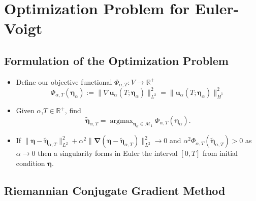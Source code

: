 \documentclass{beamer}
\def\Bmp#1{ \begin{minipage}{#1} }
\def\Emp{ \end{minipage} }
\def\hdo{\dot{H}^1}
\def\pat{\Phi_{\alpha,T}}
\def\M{{\mathcal{M}}}
\def\RR{{\mathbb{R}}}
\def\be{{\boldsymbol \eta}}
\def\bea{{\boldsymbol \eta_\alpha}}
\def\ua{\boldsymbol u_\alpha}
\def\bnabla{\boldsymbol{\nabla}}
\DeclareMathOperator*{\argmax}{argmax}
\begin{document}
\section{Optimization Problem for Euler-Voigt}


\subsection{Formulation of the Optimization Problem}
\frame
{
\hspace*{-1.0cm}
\Bmp{12cm}
\raggedright

\begin{itemize}
\item<1->
Define our objective functional $\pat : V\rightarrow \RR^+$
\begin{equation*}\label{eq:objective:function}
\pat(\bea) := \|\nabla \ua(T;\bea)\|_{L^2}^2 = \|\ua(T;\bea)\|_{\hdo}^2
\end{equation*}
\smallskip

\item<2->
Given $\alpha$,$T \in \RR^+$, find
\begin{equation*}
\tilde{\be}_{\alpha,T} = \argmax_{\bea\in \M_1} \pat(\bea).
\end{equation*}

\item<3->
If $\|\be-\tilde{\be}_{\alpha,T}\|_{L^2}^2+\alpha^2\|\bnabla(\be-\tilde{\be}_{\alpha,T})\|_{L^2}^2 \rightarrow 0$ and $\alpha^2\pat(\tilde{\be}_{\alpha,T})>0$ as $\alpha \rightarrow 0$ then a singularity forms in Euler the interval $[0,T]$ from initial condition $\be$.

\end{itemize}
\Emp
}

\subsection{Riemannian Conjugate Gradient Method}
\end{document}
